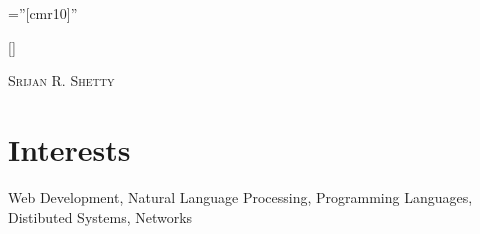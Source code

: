\documentclass[a4paper,10pt]{article} %
\begin{document}
\font\fb=''[cmr10]'' %

\titleformat{\section}{\large\scshape\raggedright}{}{0em}{}[\titlerule] %

\pagestyle{scrheadings} %

\addtolength{\voffset}{-0.5in} %
\addtolength{\textheight}{3cm} %


\renewcommand{\headfont}{\normalfont\rmfamily\scshape} %



{\centering
    {\fontsize{36}{36}\selectfont\scshape
    Srijan R. Shetty}\\
}

\section{Interests}

Web Development, Natural Language Processing, Programming Languages, Distibuted Systems,
Networks

\end{document}
